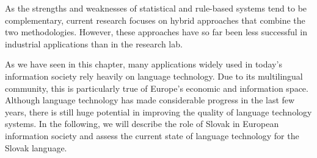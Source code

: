 \begin{multicols}{2}
As the strengths and weaknesses of statistical and rule-based systems tend to be complementary, current research focuses on hybrid approaches that combine the two methodologies. However, these approaches have so far been less successful in industrial applications than in the research lab. 

As we have seen in this chapter, many applications widely used in today’s information society rely heavily on language technology. Due to its multilingual community, this is particularly true of Europe’s economic and information space. Although language technology has made considerable progress in the last few years, there is still huge potential in improving the quality of language technology systems. In the following, we will describe the role of Slovak in European information society and assess the current state of language technology for the Slovak language. 

\end{multicols}
\vfill
\clearpage

